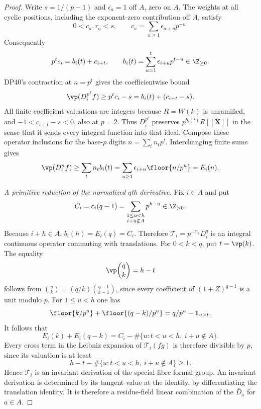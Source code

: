 \begin{proof}
Write $s=1/(p-1)$ and $\epsilon_a=1$ off $A$, zero on $A$. The weights at all cyclic positions, including the exponent-zero contribution off $A$, satisfy
\[
 0<c_a,r_a<s,\qquad
 c_a=\sum_{u\ge1}\epsilon_{a+u}p^{-u}.
\]
Consequently
\[
 p^tc_i=b_i(t)+c_{i+t},\qquad
 b_i(t)=\sum_{u=1}^t\epsilon_{i+u}p^{t-u}\in\Z_{\ge0}.
\]
DP40's contraction at $n=p^t$ gives the coefficientwise bound
\[
 \vp(D_i^{p^t}f)\ge p^tc_i-s=b_i(t)+(c_{i+t}-s).
\]
All finite coefficient valuations are integers because $R=W(k)$ is unramified, and $-1<c_{i+t}-s<0$, also at $p=2$.
Thus $D_i^{p^t}$ preserves $p^{b_i(t)}R[[\mathbf X]]$ in the sense that it sends every integral function into that ideal. Compose these operator inclusions for the base-$p$ digits $n=\sum_tn_tp^t$. Interchanging finite sums gives
\[
 \vp(D_i^nf)\ge\sum_tn_tb_i(t)
       =\sum_{u\ge1}\epsilon_{i+u}\floor{n/p^u}=E_i(n).
\]

\emph{A primitive reduction of the normalized $q$th derivative.}
Fix $i\in A$ and put
\[
 C_i=c_i(q-1)=
       \sum_{\substack{1\le u<h\\i+u\notin A}}p^{h-u}\in\Z_{>0}.
\]
Because $i+h\in A$, $b_i(h)=E_i(q)=C_i$. Therefore
$\mathscr T_i=p^{-C_i}D_i^q$ is an integral continuous operator commuting with translations.
For $0<k<q$, put $t=\vp(k)$.
The equality
\[
 \vp\binom qk=h-t
\]
follows from $\binom qk=(q/k)\binom{q-1}{k-1}$, since every coefficient of
$(1+Z)^{q-1}$ is a unit modulo $p$.
For $1\le u<h$ one has
\[
 \floor{k/p^u}+\floor{(q-k)/p^u}
       =q/p^u-\mathbf1_{u>t}.
\]
It follows that
\[
 E_i(k)+E_i(q-k)
       =C_i-\#\{u:t<u<h,\ i+u\notin A\}.
\]
Every cross term in the Leibniz expansion of $\mathscr T_i(fg)$ is therefore divisible by $p$, since its valuation is at least
\[
 h-t-\#\{u:t<u<h,\ i+u\notin A\}\ge1.
\]
Hence $\overline{\mathscr T}_i$ is an invariant derivation of the special-fibre formal group. An invariant derivation is determined by its tangent value at the identity, by differentiating the translation identity. It is therefore a residue-field linear combination of the $\bar D_a$ for $a\in A$.


\end{proof}
